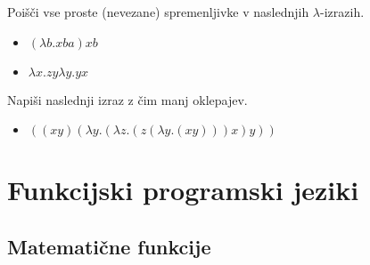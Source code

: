 \begin{ex}
Poi\v s\v ci vse proste (nevezane) spremenljivke v naslednjih $\lambda$-izrazih. 
\begin{itemize}
\item $(\lambda b.xba)xb$ 
\item $\lambda x.zy\lambda y.yx $
\end{itemize}
\end{ex}
\begin{ex}
Napi\v si naslednji izraz z \v cim manj oklepajev. 

 \begin{itemize}
 \item $((xy)(\lambda y.(\lambda z.(z(\lambda y.(xy)))x)y)) $
 \end{itemize}


\end{ex} 


\chapter{Funkcijski programski jeziki}

\section{Matemati\v cne funkcije}

